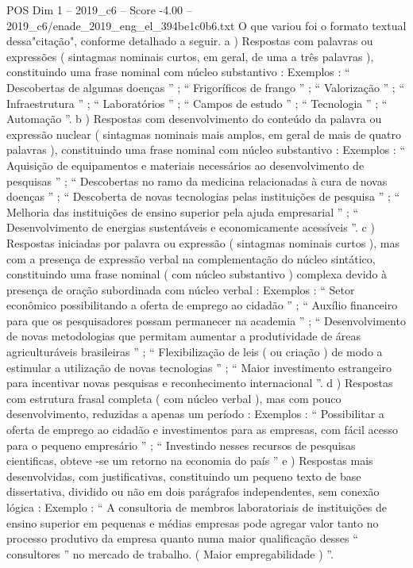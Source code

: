 \begin{textsample}{POS Dim 1 – 2019\_c6 – Score -4.00 – 2019\_c6/enade\_2019\_eng\_el\_394be1c0b6.txt}
O que variou foi o formato textual dessa"citação", conforme detalhado a seguir. a ) Respostas com palavras ou expressões ( sintagmas nominais curtos, em geral, de uma a três palavras ), constituindo uma frase nominal com núcleo substantivo : Exemplos : “ Descobertas de algumas doenças ” ; “ Frigoríficos de frango ” ; “ Valorização ” ; “ Infraestrutura ” ; “ Laboratórios ” ; “ Campos de estudo ” ; “ Tecnologia ” ; “ Automação ”. b ) Respostas com desenvolvimento do conteúdo da palavra ou expressão nuclear ( sintagmas nominais mais amplos, em geral de mais de quatro palavras ), constituindo uma frase nominal com núcleo substantivo : Exemplos : “ Aquisição de equipamentos e materiais necessários ao desenvolvimento de pesquisas ” ; “ Descobertas no ramo da medicina relacionadas à cura de novas doenças ” ; “ Descoberta de novas tecnologias pelas instituições de pesquisa ” ; “ Melhoria das instituições de ensino superior pela ajuda empresarial ” ; “ Desenvolvimento de energias sustentáveis e economicamente acessíveis ”. c ) Respostas iniciadas por palavra ou expressão ( sintagmas nominais curtos ), mas com a presença de expressão verbal na complementação do núcleo sintático, constituindo uma frase nominal ( com núcleo substantivo ) complexa devido à presença de oração subordinada com núcleo verbal : Exemplos : “ Setor econômico possibilitando a oferta de emprego ao cidadão ” ; “ Auxílio financeiro para que os pesquisadores possam permanecer na academia ” ; “ Desenvolvimento de novas metodologias que permitam aumentar a produtividade de áreas agriculturáveis brasileiras ” ; “ Flexibilização de leis ( ou criação ) de modo a estimular a utilização de novas tecnologias ” ; “ Maior investimento estrangeiro para incentivar novas pesquisas e reconhecimento internacional ”. d ) Respostas com estrutura frasal completa ( com núcleo verbal ), mas com pouco desenvolvimento, reduzidas a apenas um período : Exemplos : “ Possibilitar a oferta de emprego ao cidadão e investimentos para as empresas, com fácil acesso para o pequeno empresário ” ; “ Investindo nesses recursos de pesquisas cientificas, obteve -se um retorno na economia do país ” e ) Respostas mais desenvolvidas, com justificativas, constituindo um pequeno texto de base dissertativa, dividido ou não em dois parágrafos independentes, sem conexão lógica : Exemplo : “ A consultoria de membros laboratoriais de instituições de ensino superior em pequenas e médias empresas pode agregar valor tanto no processo produtivo da empresa quanto numa maior qualificação desses “ consultores ” no mercado de trabalho. ( Maior empregabilidade ) ”.

\end{textsample}
